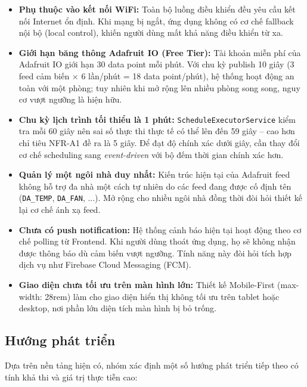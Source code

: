 \begin{itemize}
    \item \textbf{Phụ thuộc vào kết nối WiFi:} Toàn bộ luồng điều khiển đều yêu cầu kết nối Internet ổn định. Khi mạng bị ngắt, ứng dụng không có cơ chế fallback nội bộ (local control), khiến người dùng mất khả năng điều khiển từ xa.

    \item \textbf{Giới hạn băng thông Adafruit IO (Free Tier):} Tài khoản miễn phí của Adafruit IO giới hạn 30 data point mỗi phút. Với chu kỳ publish 10 giây (3 feed cảm biến × 6 lần/phút = 18 data point/phút), hệ thống hoạt động an toàn với một phòng; tuy nhiên khi mở rộng lên nhiều phòng song song, nguy cơ vượt ngưỡng là hiện hữu.

    \item \textbf{Chu kỳ lịch trình tối thiểu là 1 phút:} \texttt{ScheduleExecutorService} kiểm tra mỗi 60 giây nên sai số thực thi thực tế có thể lên đến 59 giây – cao hơn chỉ tiêu NFR-A1 đề ra là 5 giây. Để đạt độ chính xác dưới giây, cần thay đổi cơ chế scheduling sang \textit{event-driven} với bộ đếm thời gian chính xác hơn.

    \item \textbf{Quản lý một ngôi nhà duy nhất:} Kiến trúc hiện tại của Adafruit feed không hỗ trợ đa nhà một cách tự nhiên do các feed đang được cố định tên (\texttt{DA\_TEMP}, \texttt{DA\_FAN}, ...). Mở rộng cho nhiều ngôi nhà đồng thời đòi hỏi thiết kế lại cơ chế ánh xạ feed.

    \item \textbf{Chưa có push notification:} Hệ thống cảnh báo hiện tại hoạt động theo cơ chế polling từ Frontend. Khi người dùng thoát ứng dụng, họ sẽ không nhận được thông báo dù cảm biến vượt ngưỡng. Tính năng này đòi hỏi tích hợp dịch vụ như Firebase Cloud Messaging (FCM).

    \item \textbf{Giao diện chưa tối ưu trên màn hình lớn:} Thiết kế Mobile-First (max-width: 28rem) làm cho giao diện hiển thị không tối ưu trên tablet hoặc desktop, nơi phần lớn diện tích màn hình bị bỏ trống.
\end{itemize}

\subsection{Hướng phát triển}

Dựa trên nền tảng hiện có, nhóm xác định một số hướng phát triển tiếp theo có tính khả thi và giá trị thực tiễn cao:

